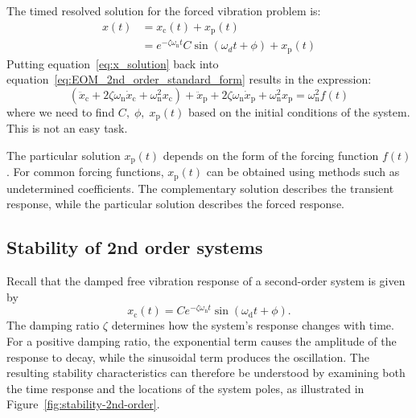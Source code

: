 \documentclass[12pt,letter]{article}
\begin{document}
The timed resolved solution for the forced vibration problem is:
\begin{align}
\label{eq:x_solution}
x(t) &= x_\text{c}(t) + x_\text{p}(t)  \\
& = e^{-\zeta \omega_\text{n} t } C \sin (\omega_d t + \phi) + x_\text{p}(t) \nonumber
\end{align}
Putting equation~\ref{eq:x_solution} back into equation~\ref{eq:EOM_2nd_order_standard_form} results in the expression:
\begin{equation}
(\ddot{x}_\text{c} + 2 \zeta \omega_\text{n} \dot{x}_\text{c} + \omega_\text{n}^2 x_\text{c}) + \ddot{x}_\text{p} + 2 \zeta \omega_\text{n} \dot{x}_\text{p} + \omega_\text{n}^2 x_\text{p} = \omega_\text{n}^2f(t)
\end{equation}
where we need to find $C, \; \phi, \; x_\text{p}(t)$ based on the initial conditions of the system. This is not an easy task. 

\begin{mdframed}[middlelinewidth=0.5mm]
	\begin{center}
	\end{center}
	The particular solution $x_\text{p}(t)$ depends on the form of the forcing function $f(t)$. For common forcing functions, $x_\text{p}(t)$ can be obtained using methods such as undetermined coefficients. The complementary solution describes the transient response, while the particular solution describes the forced response.
\end{mdframed}


%

\subsection{Stability of 2nd order systems}

Recall that the damped free vibration response of a second-order system is given by
\begin{equation}
	x_\text{c}(t) =
	C e^{-\zeta \omega_\text{n} t}
	\sin\left(\omega_\text{d} t + \phi\right).
\end{equation}
The damping ratio $\zeta$ determines how the system's response changes with time. For a positive damping ratio, the exponential term causes the amplitude of the response to decay, while the sinusoidal term produces the oscillation.
The resulting stability characteristics can therefore be understood by examining both the time response and the locations of the system poles, as illustrated in Figure~\ref{fig:stability-2nd-order}.
\end{document}
